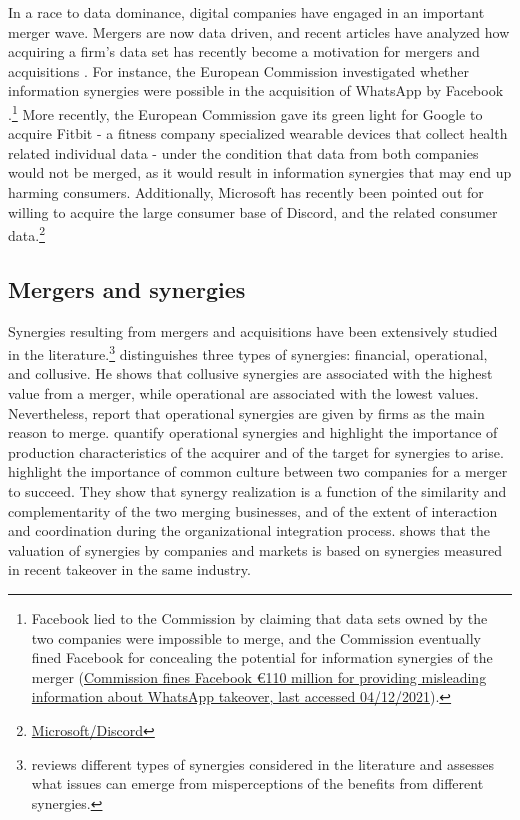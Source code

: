 \documentclass[a4paper,leqno]{article}%
\begin{document}
In a race to data dominance, digital companies have engaged in an important merger wave. Mergers are now data driven, and recent articles have analyzed how acquiring a firm's data set has recently become a motivation for mergers and acquisitions \citep{stucke2016introduction}. For instance, the European Commission investigated whether information synergies were possible in the acquisition of WhatsApp by Facebook \citep{argentesi2019merger}.\footnote{Facebook lied to the Commission by claiming that data sets owned by the two companies were impossible to merge, and the Commission eventually fined Facebook for concealing the potential for information synergies of the merger (\href{https://ec.europa.eu/commission/presscorner/detail/pl/IP_17_1369}{Commission fines Facebook €110 million for providing misleading information about WhatsApp takeover, last accessed 04/12/2021}).} More recently, the European Commission gave its green light for Google to acquire Fitbit - a fitness company specialized wearable devices that collect health related individual data - under the condition that data from both companies would not be merged, as it would result in information synergies that may end up harming consumers. Additionally, Microsoft has recently been pointed out for willing to acquire the large consumer base of Discord, and the related consumer data.\footnote{\href{https://www.lemonde.fr/economie/article/2021/04/08/microsoft-convoite-le-service-de-discussion-discord_6076070_3234.html}{Microsoft/Discord}} 


\subsection{Mergers and synergies}

Synergies resulting from mergers and acquisitions have been extensively studied in the literature.\footnote{\cite{damodaran2005value} reviews different types of synergies considered in the literature and assesses what issues can emerge from misperceptions of the benefits from different synergies.} \cite{chatterjee1986types} distinguishes three types of synergies: financial, operational, and collusive. He shows that collusive synergies are associated with the highest value from a merger, while operational are associated with the lowest values. Nevertheless, \cite{mukherjee2004merger} report that operational synergies are given by firms as the main reason to merge. \cite{gupta2002quantifying} quantify operational synergies and highlight the importance of production characteristics of the acquirer and of the target for synergies to arise. \cite{larsson1999integrating} highlight the importance of common culture between two companies for a merger to succeed. They show that synergy realization is a function of the similarity and complementarity of the two merging businesses, and of the extent of interaction and coordination during the organizational integration process. \cite{madura2008clustered} shows that the valuation of synergies by companies and markets is based on synergies measured in recent takeover in the same industry.
\end{document}
